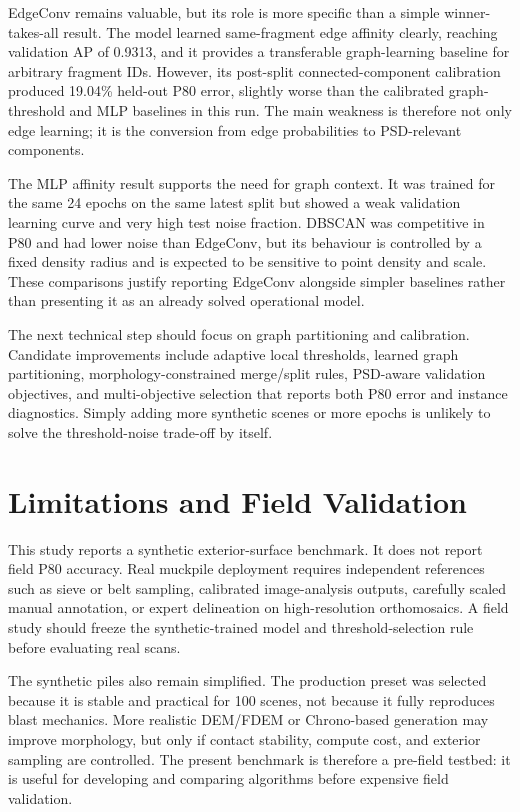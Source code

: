\documentclass[11pt]{article}
\begin{document}
EdgeConv remains valuable, but its role is more specific than a simple winner-takes-all result. The model learned same-fragment edge affinity clearly, reaching validation AP of 0.9313, and it provides a transferable graph-learning baseline for arbitrary fragment IDs. However, its post-split connected-component calibration produced 19.04\% held-out P80 error, slightly worse than the calibrated graph-threshold and MLP baselines in this run. The main weakness is therefore not only edge learning; it is the conversion from edge probabilities to PSD-relevant components.

The MLP affinity result supports the need for graph context. It was trained for the same 24 epochs on the same latest split but showed a weak validation learning curve and very high test noise fraction. DBSCAN was competitive in P80 and had lower noise than EdgeConv, but its behaviour is controlled by a fixed density radius and is expected to be sensitive to point density and scale. These comparisons justify reporting EdgeConv alongside simpler baselines rather than presenting it as an already solved operational model.

The next technical step should focus on graph partitioning and calibration. Candidate improvements include adaptive local thresholds, learned graph partitioning, morphology-constrained merge/split rules, PSD-aware validation objectives, and multi-objective selection that reports both P80 error and instance diagnostics. Simply adding more synthetic scenes or more epochs is unlikely to solve the threshold-noise trade-off by itself.

\section{Limitations and Field Validation}
This study reports a synthetic exterior-surface benchmark. It does not report field P80 accuracy. Real muckpile deployment requires independent references such as sieve or belt sampling, calibrated image-analysis outputs, carefully scaled manual annotation, or expert delineation on high-resolution orthomosaics. A field study should freeze the synthetic-trained model and threshold-selection rule before evaluating real scans.

The synthetic piles also remain simplified. The production preset was selected because it is stable and practical for 100 scenes, not because it fully reproduces blast mechanics. More realistic DEM/FDEM or Chrono-based generation may improve morphology, but only if contact stability, compute cost, and exterior sampling are controlled. The present benchmark is therefore a pre-field testbed: it is useful for developing and comparing algorithms before expensive field validation.
\end{document}
